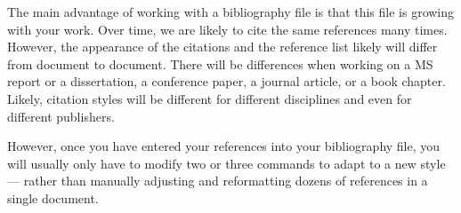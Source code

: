 \documentclass[12pt]{article}
\begin{document}
The main advantage of working with a bibliography file is that this
file is growing with your work. Over time, we are likely to cite
the same references many times. However, the appearance
of the citations and the reference list likely will differ from
document to document. There will be differences
when working on a MS report or a dissertation, a conference paper,
a journal article, or a book chapter. Likely, citation styles will be different
for different disciplines and even for different publishers.

However, once you have entered your references into your bibliography file,
you will usually only have to modify two or three commands
to adapt to a new style --- rather than manually adjusting
and reformatting dozens of references in a single document.

\newpage




\end{document}
